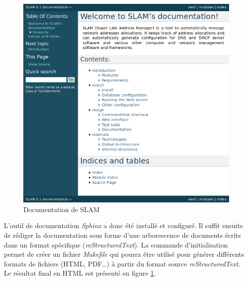 \documentclass[12pt,a4paper,twoside]{report}
\begin{document}
\begin{center}
\begin{figure}[hbt]
	\includegraphics[scale=0.45]{img/doc.png}
	\caption{Documentation de SLAM}
	\label{fig:doc}
\end{figure}
\end{center}

L’outil de documentation \emph{Sphinx} a donc été installé et configuré. Il
suffit ensuite de rédiger la documentation sous forme d’une arborescence de
documents écrits dans un format spécifique (\emph{reStructuredText}).
La commande d’initialisation permet de créer un fichier \emph{Makefile} qui
pourra être utilisé pour générer différents formats de fichiers (HTML,
PDF\dots) à partir du format source \emph{reStructuredText}. Le résultat final
en HTML est présenté en figure \ref{fig:doc}.
\end{document}
